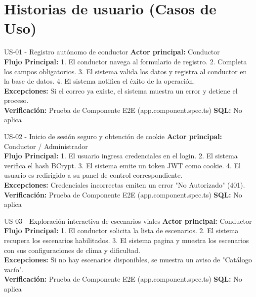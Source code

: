 \documentclass[11pt,a4paper]{article}
\begin{document}
\newpage
\section{Historias de usuario (Casos de Uso)}

\begin{requisito}{US-01 - Registro autónomo de conductor}
    \textbf{Actor principal:} Conductor\\[0.2cm]
    \textbf{Flujo Principal:} 1. El conductor navega al formulario de registro. 2. Completa los campos obligatorios. 3. El sistema valida los datos y registra al conductor en la base de datos. 4. El sistema notifica el éxito de la operación. \\[0.2cm]
    \textbf{Excepciones:} Si el correo ya existe, el sistema muestra un error y detiene el proceso.\\[0.2cm]
    \textbf{Verificación:} Prueba de Componente E2E (app.component.spec.ts) \quad \textbf{SQL:} No aplica
\end{requisito}

\begin{requisito}{US-02 - Inicio de sesión seguro y obtención de cookie}
    \textbf{Actor principal:} Conductor / Administrador\\[0.2cm]
    \textbf{Flujo Principal:} 1. El usuario ingresa credenciales en el login. 2. El sistema verifica el hash BCrypt. 3. El sistema emite un token JWT como cookie. 4. El usuario es redirigido a su panel de control correspondiente. \\[0.2cm]
    \textbf{Excepciones:} Credenciales incorrectas emiten un error "No Autorizado" (401).\\[0.2cm]
    \textbf{Verificación:} Prueba de Componente E2E (app.component.spec.ts) \quad \textbf{SQL:} No aplica
\end{requisito}

\begin{requisito}{US-03 - Exploración interactiva de escenarios viales}
    \textbf{Actor principal:} Conductor\\[0.2cm]
    \textbf{Flujo Principal:} 1. El conductor solicita la lista de escenarios. 2. El sistema recupera los escenarios habilitados. 3. El sistema pagina y muestra los escenarios con sus configuraciones de clima y dificultad. \\[0.2cm]
    \textbf{Excepciones:} Si no hay escenarios disponibles, se muestra un aviso de "Catálogo vacío".\\[0.2cm]
    \textbf{Verificación:} Prueba de Componente E2E (app.component.spec.ts) \quad \textbf{SQL:} No aplica
\end{requisito}
\end{document}
